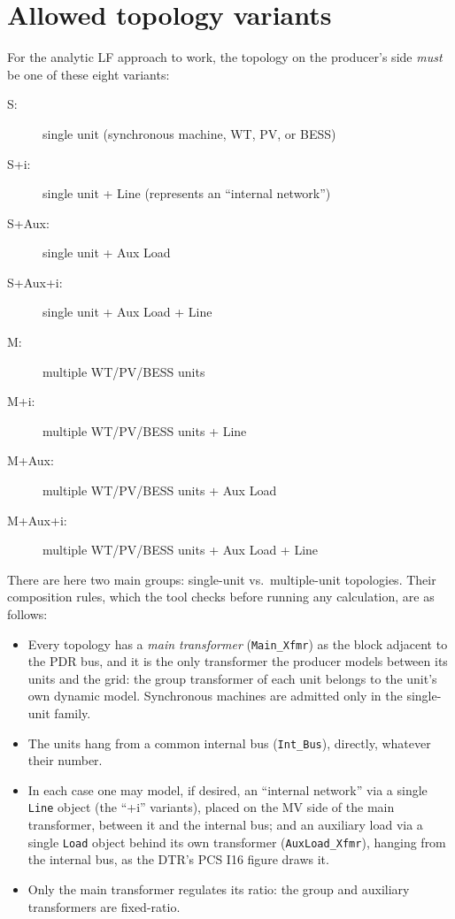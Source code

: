 \documentclass[a4paper,11pt]{article}
\newcommand{\code}[1]{\texttt{#1}}  %
\begin{document}
\section{Allowed topology variants}
\label{sec:topologies}

For the analytic LF approach to work, the topology on the producer's side \emph{must} be
one of these eight variants:
\begin{description}
\item[S:] single unit (synchronous machine, WT, PV, or BESS)
\item [S+i:] single unit + Line (represents an ``internal network'')
\item [S+Aux:] single unit + Aux Load
\item [S+Aux+i:] single unit + Aux Load + Line
\item [M:] multiple WT/PV/BESS units
\item [M+i:] multiple WT/PV/BESS units + Line
\item [M+Aux:] multiple WT/PV/BESS units + Aux Load
\item [M+Aux+i:] multiple WT/PV/BESS units + Aux Load + Line
\end{description}

There are here two main groups: single-unit vs.\ multiple-unit topologies. Their
composition rules, which the tool checks before running any calculation, are as follows:

\begin{itemize}
\item Every topology has a \emph{main transformer} (\code{Main\_Xfmr}) as the block
  adjacent to the PDR bus, and it is the only transformer the producer models between
  its units and the grid: the group transformer of each unit belongs to the unit's own
  dynamic model. Synchronous machines are admitted only in the single-unit family.
\item The units hang from a common internal bus (\code{Int\_Bus}), directly, whatever
  their number.
\item In each case one may model, if desired, an ``internal network'' via a single
  \code{Line} object (the ``+i'' variants), placed on the MV side of the main
  transformer, between it and the internal bus; and an auxiliary load via a single
  \code{Load} object behind its own transformer (\code{AuxLoad\_Xfmr}), hanging from the
  internal bus, as the DTR's PCS I16 figure draws it.
\item Only the main transformer regulates its ratio: the group and auxiliary
  transformers are fixed-ratio.
\end{itemize}
\end{document}
